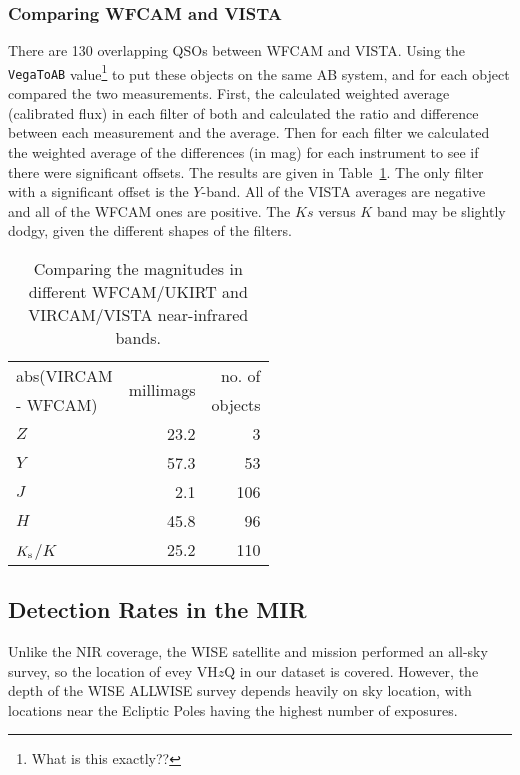 \documentclass[usenatbib]{mnras}
\begin{document}
        \subsubsection{Comparing WFCAM and VISTA}
        There are 130 overlapping QSOs between WFCAM and VISTA.  Using the
        {\tt VegaToAB} value\footnote{What is this exactly??} to put these
        objects on the same AB system, and for each object compared the two
        measurements. First, the calculated weighted average (calibrated flux)
        in each filter of both and calculated the ratio and difference between
        each measurement and the average.  Then for each filter we calculated
        the weighted average of the differences (in mag) for each instrument
        to see if there were significant offsets. The results are given in
        Table~\ref{tab:WFCAM_vs_VISTA}.  The only filter with a significant
        offset is the $Y$-band. All of the VISTA averages are negative and all
        of the WFCAM ones are positive.  The $Ks$ versus $K$ band may be
        slightly dodgy, given the different shapes of the filters.
        \begin{table}
          \centering
          \begin{tabular}{l r r}
            \hline  \hline
            abs(VIRCAM & \multirow{2}{*}{millimags} &  no. of  \\
            -  WFCAM)      &                                        &  objects \\
            \hline
            $Z$                 &  23.2 	& 3 \\
            $Y$                 &  57.3 	& 53 \\
            $J$                  &    2.1 	& 106 \\
            $H$                 &  45.8     &  96 \\
            $K_{\rm s}$/$K$ &  25.2     & 110 \\
            \hline  \hline
          \end{tabular}
          \caption{Comparing the magnitudes in different WFCAM/UKIRT and VIRCAM/VISTA near-infrared bands.}
          \label{tab:WFCAM_vs_VISTA}
        \end{table}
        
    \subsection{Detection Rates in the MIR}
    Unlike the NIR coverage, the WISE
    satellite and mission performed an all-sky survey, so the location of
    evey VH$z$Q in our dataset is covered. However, the depth of the WISE
    ALLWISE survey depends heavily on sky location, with locations near
    the Ecliptic Poles having the highest number of exposures.
    
\end{document}
